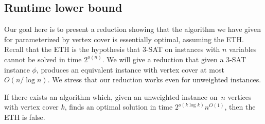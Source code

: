 \subsection{Runtime lower bound}

Our goal here is to present a reduction showing that the algorithm
we have given for \SF parameterized by vertex cover is essentially optimal,
assuming the ETH. Recall that the ETH is the hypothesis that \textsc{3-SAT} on
instances with $n$ variables cannot be solved in time $2^{o(n)}$. We will give
a reduction that given a \textsc{3-SAT} instance $\phi$, produces an equivalent
\SF instance with vertex cover at most $O(n/\log n)$. We stress that our
reduction works even for unweighted instances.


\begin{theorem} If there exists an algorithm which, given an unweighted \SF
instance on~$n$ vertices with vertex cover $k$, finds an optimal solution in
time $2^{o(k\log k)}n^{O(1)}$, then the ETH is false. \end{theorem}

